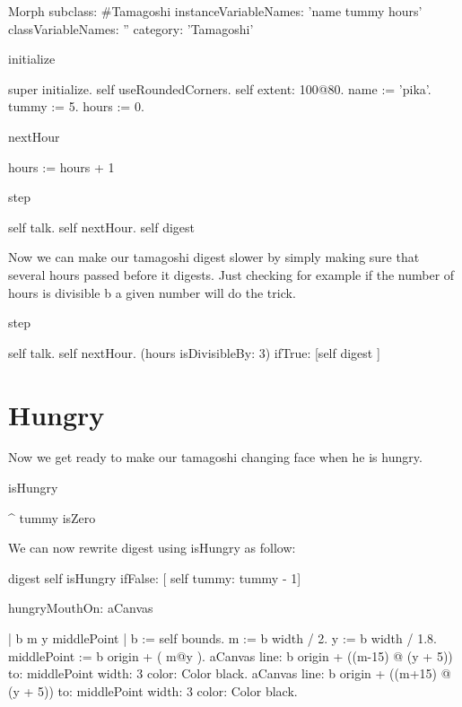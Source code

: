 \documentclass[a4paper,10pt,twoside]{book}
\begin{document}
\begin{code}{}
Morph subclass: #Tamagoshi
	instanceVariableNames: 'name tummy hours'
	classVariableNames: ''
	category: 'Tamagoshi'
\end{code}

\begin{code}{}
initialize

	super initialize. 
	self useRoundedCorners.
	self extent: 100@80.
	name := 'pika'.
	tummy := 5.
	hours := 0.
\end{code}


\begin{code}{}
nextHour
	
	hours := hours + 1
\end{code}

\begin{code}{}
step

	self talk.
	self nextHour.
	self digest
\end{code}

Now we can make our tamagoshi digest slower by simply making sure that several hours passed before it digests.
Just checking for example if the number of hours is divisible b a given number will do the trick.

\begin{code}{}
step

	self talk.
	self nextHour.
	(hours isDivisibleBy: 3)
		ifTrue: [self digest ]
\end{code}


\section{Hungry}

Now we get ready to make our tamagoshi changing face when he is hungry. 

\begin{code}{}
isHungry

	^ tummy isZero
\end{code}

We can now rewrite digest using isHungry as follow:
\begin{code}{}
digest
	self isHungry
		ifFalse: [ self tummy: tummy - 1]
\end{code}


\begin{code}{}
hungryMouthOn: aCanvas

	| b m y middlePoint |
	b := self bounds.
	m := b width / 2.
	y := b width / 1.8.
	middlePoint := b origin +  ( m@y ).
	aCanvas 
		line: b origin + ((m-15) @ (y + 5)) to:  middlePoint width: 3 color: Color black.
	aCanvas 
		line: b origin + ((m+15) @ (y + 5)) to: middlePoint width: 3 color: Color black.
\end{code}
\end{document}
